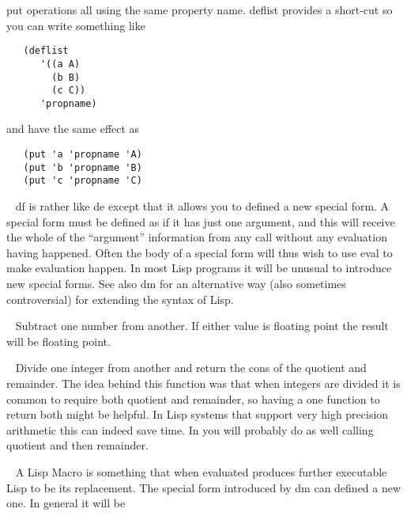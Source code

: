 \begin{description}
{\tx put} operations all using the same property name. {\tx deflist} provides
a short-cut so you can write something like
{\small\begin{verbatim}
   (deflist
      '((a A)
        (b B)
        (c C))
      'propname)
\end{verbatim}}
\noindent and have the same effect as
{\small\begin{verbatim}
   (put 'a 'propname 'A)
   (put 'b 'propname 'B)
   (put 'c 'propname 'C)
\end{verbatim}}
\item[{\tx df~~~~~~~~~~~} \hspace{1cm} {\em special form}]~\newline
{\tx df} is rather like {\tx de} except that it allows you to defined a new
special form. A special form must be defined as if it has just one
argument, and this will receive the whole of the ``argument'' information from
any call without any evaluation having happened. Often the body of a special
form will thus wish to use {\tx eval} to make evaluation happen. In most
Lisp programs it will be unusual to introduce new special forms. See also
{\tx dm} for an alternative way (also sometimes controversial)
for extending the syntax of Lisp.
\item[{\tx difference~~~} \hspace{1cm} {\em function 2 args}]~\newline
Subtract one number from another. If either value is floating point the
result will be floating point.
\item[{\tx divide~~~~~~~} \hspace{1cm} {\em function 2 args}]~\newline
Divide one integer from another and return the {\tx cons} of the quotient and
remainder. The idea behind this function was that when integers are divided
it is common to require both quotient and remainder, so having a one function
to return both might be helpful. In Lisp systems that support very high
precision arithmetic this can indeed save time. In \vsl{} you will probably
do as well calling {\tx quotient} and then {\tx remainder}. 
\item[{\tx dm~~~~~~~~~~~} \hspace{1cm} {\em special form}]~\newline
A Lisp Macro is something that when evaluated produces further executable
Lisp to be its replacement.
The special
form introduced by {\tx dm} can defined a new one. In general it will be

\end{description}
